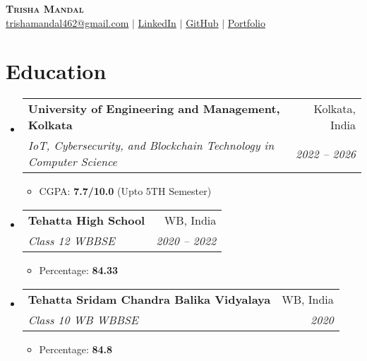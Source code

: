 \documentclass[letterpaper,11pt]{article}
\makeatletter
\newcommand{\resumeItem}[1]{
  \item\small{
    {#1 \vspace{-2pt}}
  }
}
\newcommand{\resumeSubheading}[4]{
  \vspace{-2pt}\item
    \begin{tabular*}{0.97\textwidth}[t]{l@{\extracolsep{\fill}}r}
      \textbf{#1} & #2 \\
      \textit{\small#3} & \textit{\small #4} \\
    \end{tabular*}\vspace{-7pt}
}
\newcommand{\resumeSubHeadingListStart}{\begin{itemize}[leftmargin=0.15in, label={}]}
\newcommand{\resumeSubHeadingListEnd}{\end{itemize}}
\newcommand{\resumeItemListStart}{\begin{itemize}}
\newcommand{\resumeItemListEnd}{\end{itemize}\vspace{-5pt}}
\makeatother
\begin{document}
\begin{center}
    \textbf{\Huge \scshape Trisha Mandal} \\ \vspace{1pt}
    \href{mailto:trishamandal462@gmail.com}{trishamandal462@gmail.com} $|$ 
    \href{https://www.linkedin.com/in/trishamandal123/}{LinkedIn} $|$
    \href{https://github.com/trishaamandal}{GitHub} $|$
    \href{https://trishamandal2004.netlify.app/}{Portfolio}
\end{center}


\section{Education}
  \resumeSubHeadingListStart
    \resumeSubheading
      {University of Engineering and Management, Kolkata}{Kolkata, India}
      {IoT, Cybersecurity, and Blockchain Technology in Computer Science}{2022 -- 2026}
    
      \resumeItemListStart
        \resumeItem{CGPA: \textbf{7.7/10.0}}(Upto 5TH Semester)
      \resumeItemListEnd

      \resumeSubheading
      {Tehatta High School }{WB, India}
      {Class 12 WBBSE}{2020 -- 2022}
    
      \resumeItemListStart
        \resumeItem{Percentage: \textbf{84.33}}
      \resumeItemListEnd

      \resumeSubheading
      {Tehatta Sridam Chandra Balika Vidyalaya }{WB, India}
      {Class 10 WB WBBSE }{2020}
    
      \resumeItemListStart
        \resumeItem{Percentage: \textbf{84.8}}
      \resumeItemListEnd
    
  \resumeSubHeadingListEnd





  
\end{document}

